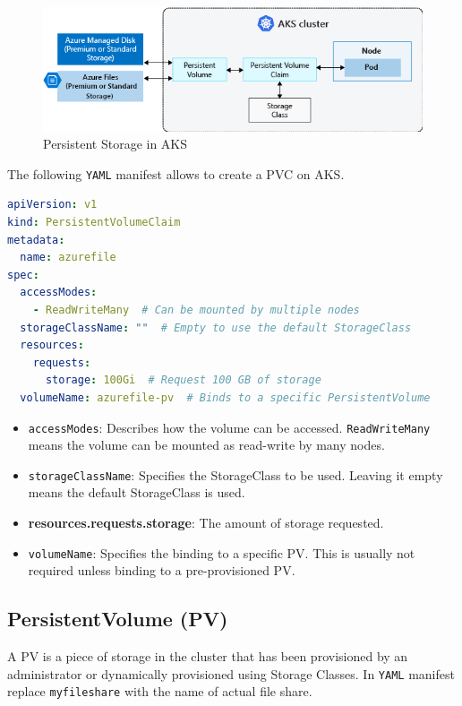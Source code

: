 \documentclass{article}
\begin{document}
\begin{figure}[H]
\includegraphics[scale=.6]{figures/persistent-volume-claims}
\caption{Persistent Storage in AKS}
\label{fig:pers_claims}
\end{figure}

The following \texttt{YAML} manifest allows to create a PVC on AKS. 

\begin{lstlisting}[language=yaml]
apiVersion: v1
kind: PersistentVolumeClaim
metadata:
  name: azurefile
spec:
  accessModes:
    - ReadWriteMany  # Can be mounted by multiple nodes
  storageClassName: ""  # Empty to use the default StorageClass
  resources:
    requests:
      storage: 100Gi  # Request 100 GB of storage
  volumeName: azurefile-pv  # Binds to a specific PersistentVolume
\end{lstlisting}

\begin{itemize}
    \item \texttt{accessModes}: Describes how the volume can be accessed. \texttt{ReadWriteMany} means the volume can be mounted as read-write by many nodes.
    \item \texttt{storageClassName}: Specifies the StorageClass to be used. Leaving it empty means the default StorageClass is used.
    \item \textbf{resources.requests.storage}: The amount of storage requested.
    \item \texttt{volumeName}: Specifies the binding to a specific PV. This is usually not required unless binding to a pre-provisioned PV.
\end{itemize}

\subsection{PersistentVolume (PV)} \label{pv}   

A PV is a piece of storage in the cluster that has been provisioned by an administrator or dynamically provisioned using Storage Classes. In \texttt{YAML} manifest replace \texttt{myfileshare} with the name of actual file share.
\end{document}
